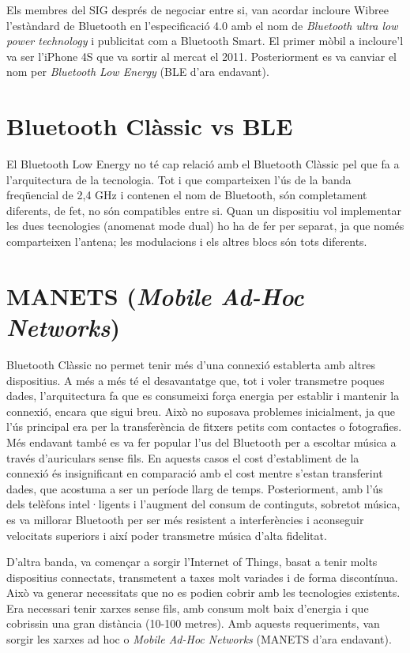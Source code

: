 Els membres del SIG després de negociar entre si, van acordar incloure Wibree l'estàndard de Bluetooth en l'especificació 4.0 amb el nom de \textit{Bluetooth ultra low power technology} i publicitat com a Bluetooth Smart. El primer mòbil a incloure'l va ser l'iPhone 4S que va sortir al mercat el 2011.
Posteriorment es va canviar el nom per \textit{Bluetooth Low Energy} (BLE d'ara endavant).

\section{Bluetooth Clàssic vs BLE}
El Bluetooth Low Energy no té cap relació amb el Bluetooth Clàssic pel que fa a l'arquitectura de la tecnologia.
Tot i que comparteixen l'ús de la banda freqüencial de 2,4 GHz i contenen el nom de Bluetooth, són completament diferents, de fet, no són compatibles entre si.
Quan un dispositiu vol implementar les dues tecnologies (anomenat mode dual) ho ha de fer per separat, ja que només comparteixen l'antena; les modulacions i els altres blocs són tots diferents.

\section{MANETS (\textit{Mobile Ad-Hoc Networks})}
Bluetooth Clàssic no permet tenir més d'una connexió establerta amb altres dispositius.
A més a més té el desavantatge que, tot i voler transmetre poques dades, l'arquitectura fa que es consumeixi força energia per establir i mantenir la connexió, encara que sigui breu.
Això no suposava problemes inicialment, ja que l'ús principal era per la transferència de fitxers petits com contactes o fotografies.
Més endavant també es va fer popular l'us del Bluetooth per a escoltar música a través d'auriculars sense fils.
En aquests casos el cost d'establiment de la connexió és insignificant en comparació amb el cost mentre s'estan transferint dades, que acostuma a ser un període llarg de temps.
Posteriorment, amb l'ús dels telèfons intel·ligents i l'augment del consum de continguts, sobretot música, es va millorar Bluetooth per ser més resistent a interferències i aconseguir velocitats superiors i així poder transmetre música d'alta fidelitat.

D'altra banda, va començar a sorgir l'Internet of Things, basat a tenir molts dispositius connectats, transmetent a taxes molt variades i de forma discontínua.
Això va generar necessitats que no es podien cobrir amb les tecnologies existents.
Era necessari tenir xarxes sense fils, amb consum molt baix d'energia i que cobrissin una gran distància (10-100 metres).
Amb aquests requeriments, van sorgir les xarxes ad hoc o \textit{Mobile Ad-Hoc Networks} (MANETS d'ara endavant).

